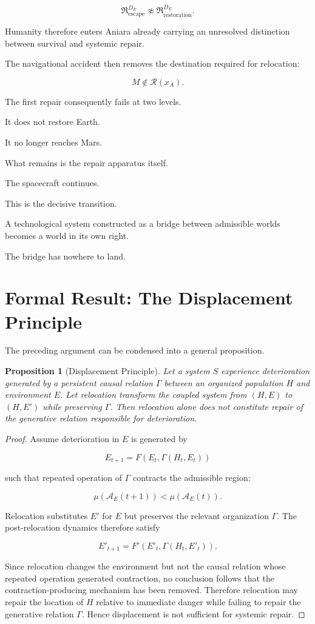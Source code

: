 \documentclass[11pt,oneside]{book}
\newtheorem{proposition}[theorem]{Proposition}
\theoremstyle{definition}
\theoremstyle{remark}
\newcommand{\A}{\mathcal{A}}
\newcommand{\R}{\mathcal{R}}
\newcommand{\Repair}{\mathfrak{R}}
\begin{document}
\[
\Repair^{D_E}_{\mathrm{escape}}
\not\approx
\Repair^{D_E}_{\mathrm{restoration}}.
\]

Humanity therefore enters Aniara already carrying an unresolved distinction between survival and systemic repair.

The navigational accident then removes the destination required for relocation:

\[
M\notin\R(x_A).
\]

The first repair consequently fails at two levels.

It does not restore Earth.

It no longer reaches Mars.

What remains is the repair apparatus itself.

The spacecraft continues.

This is the decisive transition.

A technological system constructed as a bridge between admissible worlds becomes a world in its own right.

The bridge has nowhere to land.

\section{Formal Result: The Displacement Principle}

The preceding argument can be condensed into a general proposition.

\begin{proposition}[Displacement Principle]
Let a system \(S\) experience deterioration generated by a persistent causal relation \(\Gamma\) between an organized population \(H\) and environment \(E\). Let relocation transform the coupled system from \((H,E)\) to \((H,E')\) while preserving \(\Gamma\). Then relocation alone does not constitute repair of the generative relation responsible for deterioration.
\end{proposition}

\begin{proof}
Assume deterioration in \(E\) is generated by

\[
E_{t+1}
=
F(E_t,\Gamma(H_t,E_t))
\]

such that repeated operation of \(\Gamma\) contracts the admissible region:

\[
\mu(\A_E(t+1))
<
\mu(\A_E(t)).
\]

Relocation substitutes \(E'\) for \(E\) but preserves the relevant organization \(\Gamma\). The post-relocation dynamics therefore satisfy

\[
E'_{t+1}
=
F'(E'_t,\Gamma(H_t,E'_t)).
\]

Since relocation changes the environment but not the causal relation whose repeated operation generated contraction, no conclusion follows that the contraction-producing mechanism has been removed. Therefore relocation may repair the location of \(H\) relative to immediate danger while failing to repair the generative relation \(\Gamma\). Hence displacement is not sufficient for systemic repair.
\end{proof}
\end{document}
